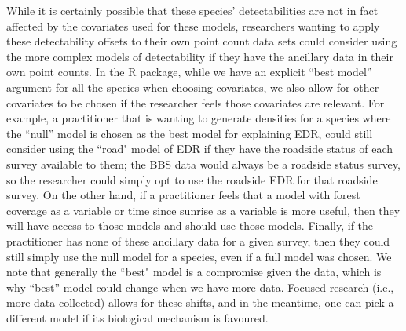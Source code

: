 \par While it is certainly possible that these species’ detectabilities are not in fact affected by the covariates used for these models, researchers wanting to apply these detectability offsets to their own point count data sets could consider using the more complex models of detectability if they have the ancillary data in their own point counts. In the  R package, while we have an explicit “best model” argument for all the species when choosing covariates, we also allow for other covariates to be chosen if the researcher feels those covariates are relevant. For example, a practitioner that is wanting to generate densities for a species where the “null” model is chosen as the best model for explaining EDR, could still consider using the ``road" model of EDR if they have the roadside status of each survey available to them; the BBS data would always be a roadside status survey, so the researcher could simply opt to use the roadside EDR for that roadside survey. On the other hand, if a practitioner feels that a model with forest coverage as a variable or time since sunrise as a variable is more useful, then they will have access to those models and should use those models. Finally, if the practitioner has none of these ancillary data for a given survey, then they could still simply use the null model for a species, even if a full model was chosen. We note that generally the ``best" model is a compromise given the data, which is why “best” model could change when we have more data. Focused research (i.e., more data collected) allows for these shifts, and in the meantime, one can pick a different model if its biological mechanism is favoured. 

